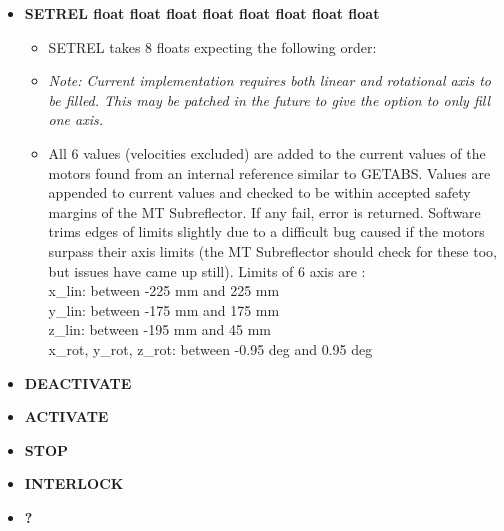 \documentclass[12pt]{report}
\begin{document}
\begin{itemize}
                        
		\item[] {\bf{SETREL float float float float float float float float }}
			\begin{itemize}
				\item[] {SETREL takes 8 floats expecting the following order:}
				
				\item[]  {\textit{Note: Current implementation requires both linear and rotational axis to be filled. This may be patched in the 
				future to give the option to only fill one axis.}}
				\item[] {All 6 values (velocities excluded) are  added to the current values of the motors found from an internal reference 
				similar to GETABS. Values are appended to current values and checked to be within accepted safety margins of the MT
				 Subreflector. If any fail, error is returned. Software trims edges of limits slightly due to a difficult bug caused if the 
				 motors surpass their axis limits (the MT Subreflector should check for these too, but issues have came up still). 
				 Limits of 6 axis are : \\ 
				x\_lin: between -225 mm and 225 mm \\
				y\_lin: between -175 mm and 175 mm \\
				z\_lin: between -195 mm and 45 mm \\
				x\_rot, \hspace{2px} y\_rot, \hspace{2px} z\_rot: between -0.95 deg and 0.95 deg}
				
			\end{itemize}
			
		\item[] {\bf{DEACTIVATE}}
			
		\item[] {\bf{ACTIVATE}}

		\item[] {\bf{STOP}}

		\item[] {\bf{INTERLOCK}}

		\item[] {\bf{?}}
\end{itemize}
 
\end{document}
